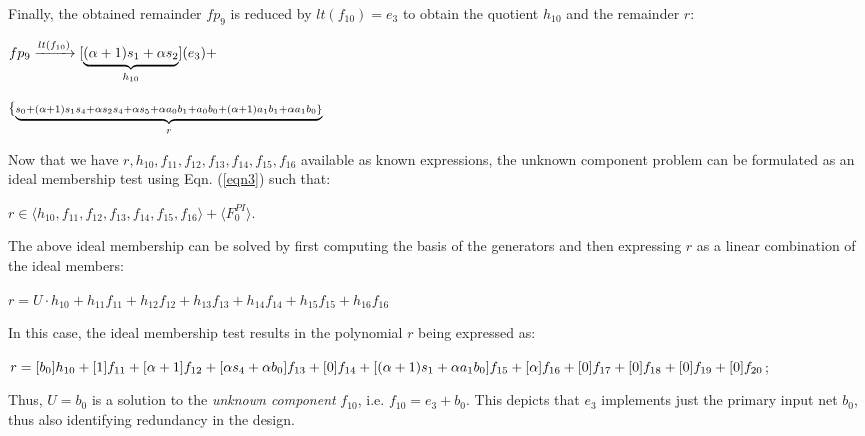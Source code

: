 \begin{Example}
Finally, the obtained remainder $fp_9$ is reduced by $lt(f_{10}) =
e_3$ to obtain the quotient $h_{10}$ and the remainder $r$: 

${ fp_9}\xrightarrow[]{{lt(f_{10})}}[\underbrace{{(\alpha+1)s_1+\alpha s_2}}_\text{$h_{10}$}]({e_3})+$ 

$\{\underbrace{{\scriptstyle s_0+(\alpha+1)s_1s_4+\alpha s_2s_4+\alpha s_5+\alpha a_0b_1+a_0b_0+(\alpha+1)a_1b_1+\alpha a_1b_0\}}}_\text{$r$}$ 

Now that we have $r,h_{10},f_{11},f_{12},f_{13},f_{14},f_{15},f_{16}$
available as known expressions, the unknown component problem can be
formulated as an ideal membership test using Eqn. (\ref{eqn3}) such that: 
\begin{center}
$r \in \langle h_{10},f_{11},f_{12},f_{13},f_{14},f_{15},f_{16}\rangle
  + \langle F_{0}^{PI}\rangle$.
\end{center}

The above ideal membership can be solved by first computing the
\Grobner basis of the generators and then expressing $r$ as a
linear combination of the ideal members: %

\begin{small}
$r = U\cdot h_{10} + h_{11}f_{11} + h_{12}f_{12}+h_{13}f_{13}+h_{14}f_{14}+h_{15}f_{15}+h_{16}f_{16}$ 
\end{small}

In this case, the ideal membership test results in the polynomial $r$
being expressed as: 


\begin{small}
$r = [b_0]h_{10}+[1]f_{11}+[\alpha+1]f_{12}+[\alpha s_4 +\alpha b_0]f_{13}+[0]f_{14}+[(\alpha+1)s_1+\alpha a_1b_0]f_{15}+[\alpha]f_{16}+[0]f_{17}+[0]f_{18}+[0]f_{19}+[0]f_{20}$;
\end{small}

Thus, $U=b_0$ is a solution to the \textit{unknown component}
$f_{10}$, i.e. $f_{10} = e_3 + b_0$. This depicts that $e_3$ implements
just the primary input net $b_0$, thus also identifying redundancy in
the design. 

\end{Example}

